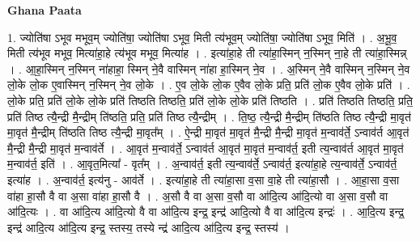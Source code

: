 \documentclass[17pt]{extarticle}
\begin{document}
\textbf{Ghana Paata } \newline

1. ज्योति॑षा ऽभूव मभूव॒म् ज्योति॑षा॒ ज्योति॑षा ऽभूव॒ मिती त्य॑भूव॒म् ज्योति॑षा॒ ज्योति॑षा ऽभूव॒ मिति॑ । . अ॒भू॒व॒ मिती त्य॑भूव मभूव॒ मित्या॑हा॒हे त्य॑भूव मभूव॒ मित्या॑ह । . इत्या॑हा॒हे ती त्या॑हा॒स्मिन् न॒स्मिन् ना॒हे ती त्या॑हा॒स्मिन्न् । . आ॒हा॒स्मिन् न॒स्मिन् ना॑हाहा॒ स्मिन् ने॒वै वास्मिन् ना॑हा हा॒स्मिन् ने॒व । . अ॒स्मिन् ने॒वै वास्मिन् न॒स्मिन् ने॒व लो॒के लो॒क ए॒वास्मिन् न॒स्मिन् ने॒व लो॒के । . ए॒व लो॒के लो॒क ए॒वैव लो॒के प्रति॒ प्रति॑ लो॒क ए॒वैव लो॒के प्रति॑ । . लो॒के प्रति॒ प्रति॑ लो॒के लो॒के प्रति॑ तिष्ठति तिष्ठति॒ प्रति॑ लो॒के लो॒के प्रति॑ तिष्ठति । . प्रति॑ तिष्ठति तिष्ठति॒ प्रति॒ प्रति॑ तिष्ठ त्यै॒न्द्री मै॒न्द्रीम् ति॑ष्ठति॒ प्रति॒ प्रति॑ तिष्ठ त्यै॒न्द्रीम् । . ति॒ष्ठ॒ त्यै॒न्द्री मै॒न्द्रीम् ति॑ष्ठति तिष्ठ त्यै॒न्द्री मा॒वृत॑ मा॒वृत॑ मै॒न्द्रीम् ति॑ष्ठति तिष्ठ त्यै॒न्द्री मा॒वृत᳚म् । . ऐ॒न्द्री मा॒वृत॑ मा॒वृत॑ मै॒न्द्री मै॒न्द्री मा॒वृत॑ म॒न्वाव॑र्ते॒ ऽन्वाव॑र्त आ॒वृत॑ मै॒न्द्री मै॒न्द्री मा॒वृत॑ म॒न्वाव॑र्ते । . आ॒वृत॑ म॒न्वाव॑र्ते॒ ऽन्वाव॑र्त आ॒वृत॑ मा॒वृत॑ म॒न्वाव॑र्त॒ इती त्य॒न्वाव॑र्त आ॒वृत॑ मा॒वृत॑ म॒न्वाव॑र्त॒ इति॑ । . आ॒वृत॒मित्या᳚ - वृत᳚म् । . अ॒न्वाव॑र्त॒ इती त्य॒न्वाव॑र्ते॒ ऽन्वाव॑र्त॒ इत्या॑हा॒हे त्य॒न्वाव॑र्ते॒ ऽन्वाव॑र्त॒ इत्या॑ह । . अ॒न्वाव॑र्त॒ इत्य॑नु - आव॑र्ते । . इत्या॑हा॒हे ती त्या॑हा॒सा व॒सा वा॒हे ती त्या॑हा॒सौ । . आ॒हा॒सा व॒सा वा॑हा हा॒सौ वै वा अ॒सा वा॑हा हा॒सौ वै । . अ॒सौ वै वा अ॒सा व॒सौ वा आ॑दि॒त्य आ॑दि॒त्यो वा अ॒सा व॒सौ वा आ॑दि॒त्यः । . वा आ॑दि॒त्य आ॑दि॒त्यो वै वा आ॑दि॒त्य इन्द्र॒ इन्द्र॑ आदि॒त्यो वै वा आ॑दि॒त्य इन्द्रः॑ । . आ॒दि॒त्य इन्द्र॒ इन्द्र॑ आदि॒त्य आ॑दि॒त्य इन्द्र॒ स्तस्य॒ तस्ये न्द्र॑ आदि॒त्य आ॑दि॒त्य इन्द्र॒ स्तस्य॑ । \newline
\end{document}
